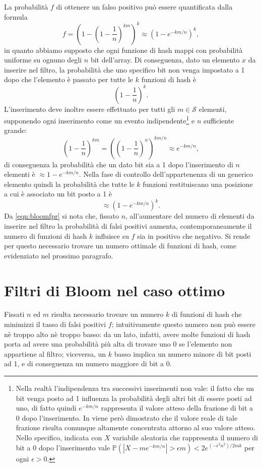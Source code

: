 \documentclass[../../main.tex]{subfiles}
\begin{document}
La probabilità $f$ di ottenere un falso positivo può essere quantificata dalla formula
\begin{equation}
    f = \left(1 - \left(1 - \frac{1}{n}\right)^{km}\right)^k \approx \left(1 - e^{-km/n}\right)^k,
    \label{eqn:bloomfpr}
\end{equation}
in quanto abbiamo supposto che ogni funzione di hash mappi con probabilità uniforme su ognuno degli $n$ bit  dell'array. Di conseguenza, dato un elemento $x$ da inserire nel filtro, la probabilità che uno specifico bit non venga impostato a 1 dopo che l'elemento è passato per tutte le $k$ funzioni di hash è
\[\left(1 - \frac{1}{n}\right)^k.\]
L'inserimento deve inoltre essere effettuato per tutti gli $m \in \mathcal{S}$ elementi, supponendo ogni inserimento come un evento indipendente\footnote{Nella realtà l'indipendenza tra successivi inserimenti non vale: il fatto che un bit venga posto ad 1 influenza la probabilità degli altri bit di essere posti ad uno, di fatto quindi $e^{-km/n}$ rappresenta il valore atteso della frazione di bit a 0 dopo l'inserimento. In \cite{10.1145/383962.384004} viene però dimostrato che il valore reale di tale frazione risulta comunque altamente concentrata attorno al suo valore atteso. Nello specifico, indicata con $X$ variabile aleatoria che rappresenta il numero di bit a 0 dopo l'inserimento vale $\mathbb{P}\left(|X - m e^{-km/n}| > \epsilon m \right) < 2e^{(-\epsilon^2 n^2)/2mk}$ per ogni $\epsilon > 0$.} e $n$ sufficiente grande:
\[\left(1 - \frac{1}{n}\right)^{km} = \left(\left(1 - \frac{1}{n}\right)^n\right)^{km/n} \approx e^{-km/n},\]
di conseguenza la probabilità che un dato bit sia a 1 dopo l'inserimento di $n$ elementi è $\approx 1 - e^{-km/n}$. Nella fase di controllo dell'appartenenza di un generico elemento quindi la probabilità che tutte le $k$ funzioni restituiscano una posizione a cui è associato un bit posto a 1 è
\[\approx \left(1 - e^{-km/n}\right)^k.\]
Da \eqref{eqn:bloomfpr} si nota che, fissato $n$, all'aumentare del numero di elementi da inserire nel filtro la probabilità di falsi positivi aumenta, contemporaneamente il numero di funzioni di hash $k$ influisce su $f$ sia in positivo che negativo. Si rende per questo necessario trovare un numero ottimale di funzioni di hash, come evidenziato nel prossimo paragrafo.

\section{Filtri di Bloom nel caso ottimo}
Fissati $n$ ed $m$ risulta necessario trovare un numero $k$ di funzioni di hash che minimizzi il tasso di falsi positivi $f$; intuitivamente questo numero non può essere nè troppo alto nè troppo basso: da un lato, infatti, avere molte funzioni di hash porta ad avere una probabilità più alta di trovare uno 0 se l'elemento non appartiene al filtro; viceversa, un $k$ basso implica un numero minore di bit posti ad 1, e di conseguenza un numero maggiore di bit a 0. 
\end{document}
